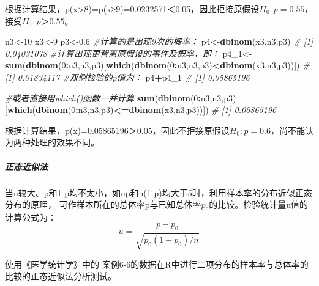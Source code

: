 \documentclass[
]{article}
\newenvironment{Shaded}{\begin{snugshade}}{\end{snugshade}}
\newcommand{\CommentTok}[1]{\textcolor[rgb]{0.56,0.35,0.01}{\textit{#1}}}
\newcommand{\DecValTok}[1]{\textcolor[rgb]{0.00,0.00,0.81}{#1}}
\newcommand{\FloatTok}[1]{\textcolor[rgb]{0.00,0.00,0.81}{#1}}
\newcommand{\KeywordTok}[1]{\textcolor[rgb]{0.13,0.29,0.53}{\textbf{#1}}}
\newcommand{\NormalTok}[1]{#1}
\newcommand{\OperatorTok}[1]{\textcolor[rgb]{0.81,0.36,0.00}{\textbf{#1}}}
\begin{document}
根据计算结果，p(x\textgreater8)=p(x≥9)=0.0232571＜0.05，因此拒接原假设\(H_0:p=0.55\)，接受\(H_1:p＞0.55\)。

\begin{Shaded}
\begin{Highlighting}[]
\NormalTok{n3<-}\DecValTok{10}
\NormalTok{x3<-}\DecValTok{9}
\NormalTok{p3<-}\FloatTok{0.6}
\CommentTok{#计算的是出现9次的概率：}
\NormalTok{p4<-}\KeywordTok{dbinom}\NormalTok{(x3,n3,p3)}
\CommentTok{# [1] 0.04031078}
\CommentTok{#计算出现更背离原假设的事件及概率，即：}
\NormalTok{p4_}\DecValTok{1}\NormalTok{<-}\KeywordTok{sum}\NormalTok{(}\KeywordTok{dbinom}\NormalTok{(}\DecValTok{0}\OperatorTok{:}\NormalTok{n3,n3,p3)[}\KeywordTok{which}\NormalTok{(}\KeywordTok{dbinom}\NormalTok{(}\DecValTok{0}\OperatorTok{:}\NormalTok{n3,n3,p3)}\OperatorTok{<}\KeywordTok{dbinom}\NormalTok{(x3,n3,p3))])}
\CommentTok{# [1] 0.01834117}
\CommentTok{#双侧检验的p值为：}
\NormalTok{p4}\OperatorTok{+}\NormalTok{p4_}\DecValTok{1}
\CommentTok{# [1] 0.05865196}

\CommentTok{#或者直接用which()函数一并计算}
\KeywordTok{sum}\NormalTok{(}\KeywordTok{dbinom}\NormalTok{(}\DecValTok{0}\OperatorTok{:}\NormalTok{n3,n3,p3)[}\KeywordTok{which}\NormalTok{(}\KeywordTok{dbinom}\NormalTok{(}\DecValTok{0}\OperatorTok{:}\NormalTok{n3,n3,p3)}\OperatorTok{<=}\KeywordTok{dbinom}\NormalTok{(x3,n3,p3))])}
\CommentTok{# [1] 0.05865196}
\end{Highlighting}
\end{Shaded}

根据计算结果，p(x)=0.05865196＞0.05，因此不拒接原假设\(H_0:p=0.6\)，尚不能认为两种处理的效果不同。

\hypertarget{ux6b63ux6001ux8fd1ux4f3cux6cd5-1}{%
\subparagraph{正态近似法}\label{ux6b63ux6001ux8fd1ux4f3cux6cd5-1}}

当n较大、p和1-p均不太小，如np和n(1-p)均大于5时，利用样本率的分布近似正态分布的原理，
可作样本所在的总体率p与已知总体率\(p_0\)的比较。检验统计量u值的计算公式为：
\[u=\frac{p-p_0}{\sqrt{p_0(1-p_0)/n}}\]

使用《医学统计学》中的 案例6-6的数据在R中进行二项分布的样本率与总体率的比较的正态近似法分析测试。
\end{document}
